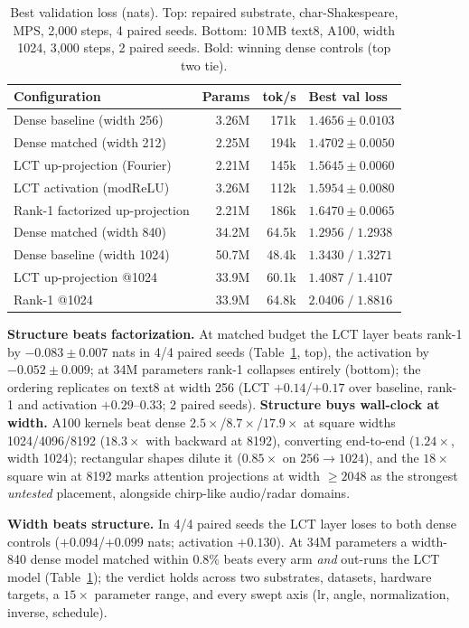 \documentclass{article}
\begin{document}
\begin{table}[t]
\centering
\caption{Best validation loss (nats). Top: repaired substrate, char-Shakespeare, MPS, 2{,}000
steps, 4 paired seeds. Bottom: 10\,MB text8, A100, width 1024, 3{,}000 steps, 2 paired seeds.
Bold: winning dense controls (top two tie).}
\label{tab:main}
\footnotesize
\setlength{\tabcolsep}{5pt}
\begin{tabular}{lrrl}
\toprule
Configuration & Params & tok/s & Best val loss \\
\midrule
Dense baseline (width 256) & 3.26M & 171k & $\mathbf{1.4656 \pm 0.0103}$ \\
Dense matched (width 212) & 2.25M & 194k & $\mathbf{1.4702 \pm 0.0050}$ \\
LCT up-projection (Fourier) & 2.21M & 145k & $1.5645 \pm 0.0060$ \\
LCT activation (modReLU) & 3.26M & 112k & $1.5954 \pm 0.0080$ \\
Rank-1 factorized up-projection & 2.21M & 186k & $1.6470 \pm 0.0065$ \\
\midrule
Dense matched (width 840) & 34.2M & 64.5k & $\mathbf{1.2956\;/\;1.2938}$ \\
Dense baseline (width 1024) & 50.7M & 48.4k & $1.3430\;/\;1.3271$ \\
LCT up-projection @1024 & 33.9M & 60.1k & $1.4087\;/\;1.4107$ \\
Rank-1 @1024 & 33.9M & 64.8k & $2.0406\;/\;1.8816$ \\
\bottomrule
\end{tabular}
\end{table}

\textbf{Structure beats factorization.} At matched budget the LCT layer beats rank-1 by
$-0.083 \pm 0.007$ nats in 4/4 paired seeds (Table~\ref{tab:main}, top), the activation by
$-0.052 \pm 0.009$; at 34M parameters rank-1 collapses entirely (bottom); the ordering
replicates on text8 at width 256 (LCT $+0.14$/$+0.17$ over baseline, rank-1 and activation
$+0.29$--$0.33$; 2 paired seeds). \textbf{Structure buys wall-clock at width.} A100 kernels beat
dense
$2.5\times$/$8.7\times$/$17.9\times$ at square widths 1024/4096/8192 ($18.3\times$ with
backward at 8192), converting end-to-end ($1.24\times$, width 1024); rectangular shapes dilute it
($0.85\times$ on $256\to1024$), and the $18\times$ square win at 8192 marks attention projections
at width $\geq 2048$ as the strongest \emph{untested} placement, alongside chirp-like
audio/radar domains.

\textbf{Width beats structure.} In 4/4 paired seeds the LCT layer loses to both dense controls
($+0.094$/$+0.099$ nats; activation $+0.130$). At 34M parameters a width-840 dense model matched
within 0.8\% beats every arm \emph{and} out-runs the LCT model (Table~\ref{tab:main}); the
verdict holds across two substrates, datasets, hardware targets, a $15\times$ parameter range, and
every swept axis (lr, angle, normalization, inverse, schedule).
\end{document}
